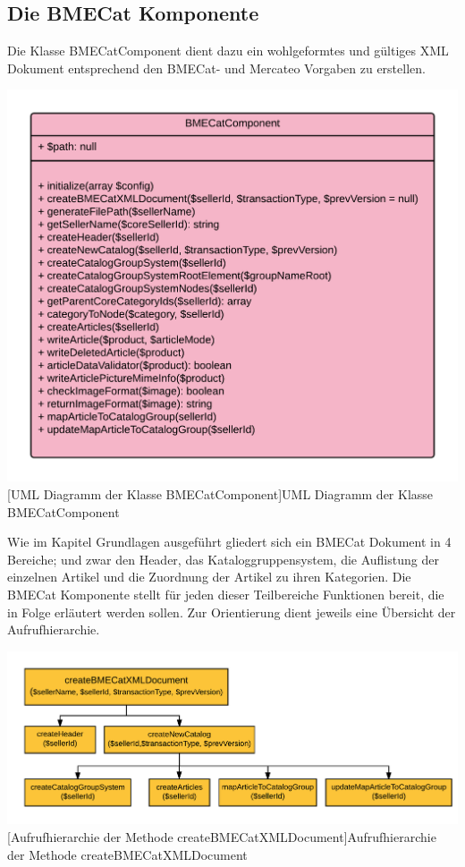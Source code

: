 	\subsection{Die BMECat Komponente}
	
	Die Klasse BMECatComponent dient dazu ein wohlgeformtes und gültiges XML Dokument entsprechend den BMECat- und Mercateo Vorgaben zu erstellen. \\
	\begin{minipage}{\linewidth}
		\vspace{1em}
		\centering
		\includegraphics[width=0.8 \linewidth]{img/BMECatComponentUML}
		[UML Diagramm der Klasse BMECatComponent]{UML Diagramm der Klasse BMECatComponent}
		\vspace{1em}
	\end{minipage}
	Wie im Kapitel Grundlagen ausgeführt gliedert sich ein BMECat Dokument in 4 Bereiche; und zwar den Header, das Kataloggruppensystem, die Auflistung der einzelnen Artikel und die Zuordnung der Artikel zu ihren Kategorien. Die BMECat Komponente stellt für jeden dieser Teilbereiche Funktionen bereit, die in Folge erläutert werden sollen.
	Zur Orientierung dient jeweils eine Übersicht der Aufrufhierarchie.\\
	
	\begin{minipage}{\linewidth}
		\vspace{1em}
		\centering
		\includegraphics[width=0.8 \linewidth]{img/createBMECatHierarchie}
		[Aufrufhierarchie der Methode createBMECatXMLDocument]{Aufrufhierarchie der Methode createBMECatXMLDocument}
		\vspace{1em}
	\end{minipage}
	
